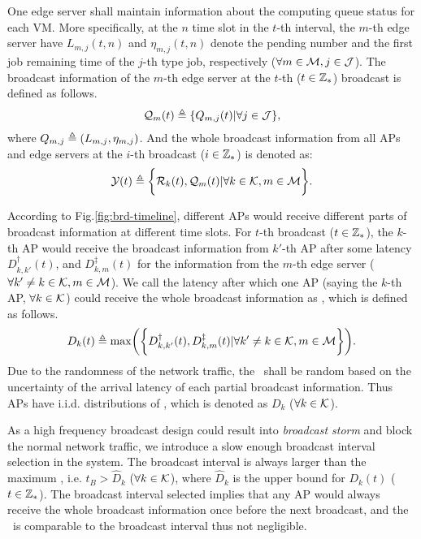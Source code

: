 One edge server shall maintain information about the computing queue status for each VM.
More specifically, at the $n$ time slot in the $t$-th interval, the $m$-th edge server have $L_{m,j}({t,n})$ and $\eta_{m,j}({t,n})$ denote the pending number and the first job remaining time of the $j$-th type job, respectively ($\forall m\in\mathcal{M}, j\in\mathcal{J}$).
The broadcast information of the $m$-th edge server at the $t$-th ($t\in\mathbb{Z}_{*}$) broadcast is defined as follows.
\begin{align}
    \mathcal{Q}_{m}({t}) \triangleq \{Q_{m,j}({t}) | \forall j\in\mathcal{J}\},
\end{align}
where $Q_{m,j} \triangleq (L_{m,j}, \eta_{m,j})$.
And the whole broadcast information from all APs and edge servers at the $i$-th broadcast ($i\in\mathbb{Z}_{*}$) is denoted as:
\begin{align}
    \mathcal{Y}({t}) \triangleq
        \bigg\{
            \mathcal{R}_{k}({t}), \mathcal{Q}_{m}({t}) | \forall k\in\mathcal{K}, m\in\mathcal{M}
        \bigg\}.
\end{align}

According to Fig.\ref{fig:brd-timeline}, different APs would receive different parts of broadcast information at different time slots.
For $t$-th broadcast ($t\in\mathbb{Z}_{*}$), the $k$-th AP would receive the broadcast information from $k'$-th AP after some latency $D^{\dagger}_{k,k'}({t})$, and $D^{\ddagger}_{k,m}({t})$ for the information from the $m$-th edge server ($\forall k' \neq k \in\mathcal{K}, m\in\mathcal{M}$).
We call the latency after which one AP (saying the $k$-th AP, $\forall k\in\mathcal{K}$) could receive the whole broadcast information as \brdelay, which is defined as follows.
\begin{align}
    D_{k}({t}) \define \max\Paren{\Brace{
        D^{\dagger}_{k,k'}({t}),
        D^{\ddagger}_{k,m}({t}) | \forall k' \neq k \in \apSet, m\in\esSet
    }}.
\end{align}
Due to the randomness of the network traffic, the \brdelay~shall be random based on the uncertainty of the arrival latency of each partial broadcast information.
Thus APs have i.i.d. distributions of \brdelay, which is denoted as $D_{k}$ ($\forall k \in \mathcal{K}$).

As a high frequency broadcast design could result into \emph{broadcast storm} and block the normal network traffic, we introduce a slow enough broadcast interval selection in the system.
The broadcast interval is always larger than the maximum \brdelay, i.e. $t_B > \hat{D}_k$ ($\forall k\in\mathcal{K}$), where $\hat{D}_k$ is the upper bound for $D_{k}({t})$ ($t\in\mathbb{Z}_{*}$).
The broadcast interval selected implies that any AP would always receive the whole broadcast information once before the next broadcast, and the \brdelay~is comparable to the broadcast interval thus not negligible.

